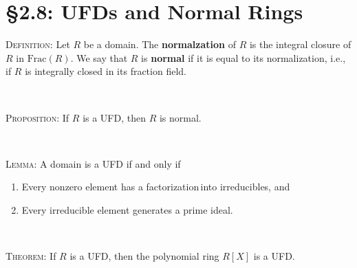 \documentclass[12pt]{amsart}
\newcommand{\showsol}[1]{\def\displaysol{#1}}
\begin{document}
\showsol{0}
	
	\thispagestyle{empty}
	
	\section*{\S2.8: UFDs and Normal Rings}	

\begin{framed}
\noindent \textsc{Definition:} Let $R$ be a domain. The \textbf{normalzation} of $R$ is the integral closure of $R$ in $\mathrm{Frac}(R)$. We say that $R$ is \textbf{normal} if it is equal to its normalization, i.e., if $R$ is integrally closed in its fraction field.


\

\noindent \textsc{Proposition:} If $R$ is a UFD, then $R$ is normal.

\

\noindent \textsc{Lemma:} A domain is a UFD if and only if
\begin{enumerate}
\item Every nonzero element has a factorization\footnotemark\,into irreducibles, and
\item Every irreducible element generates a prime ideal.
\end{enumerate}

\

\noindent \textsc{Theorem:} If $R$ is a UFD, then the polynomial ring $R[X]$ is a UFD.

 \end{framed}
\end{document}
